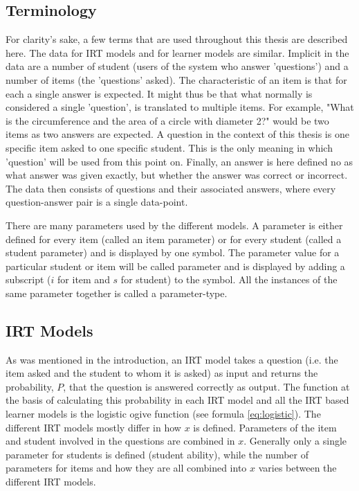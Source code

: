 \documentclass{scrartcl}
\begin{document}
\subsection{Terminology}
For clarity's sake, a few terms that are used throughout this thesis are described here. The data for IRT models and for learner models are similar. Implicit in the data are a number of student (users of the system who answer 'questions') and a number of items (the 'questions' asked). The characteristic of an item is that for each a single answer is expected. It might thus be that what normally is considered a single 'question', is translated to multiple items. For example, "What is the circumference and the area of a circle with diameter 2?" would be two items as two answers are expected. A question in the context of this thesis is one specific item asked to one specific student. This is the only meaning in which 'question' will be used from this point on. Finally, an answer is here defined no as what answer was given exactly, but whether the answer was correct or incorrect. The data then consists of questions and their associated answers, where every question-answer pair is a single data-point.  

There are many parameters used by the different models. A parameter is either defined for every item (called an item parameter) or for every student (called a student parameter) and is displayed by one symbol. The parameter value for a particular student or item will be called parameter and is displayed by adding a subscript ($i$ for item and $s$ for student) to the symbol. All the instances of the same parameter together is called a parameter-type. 

\subsection{IRT Models}
As was mentioned in the introduction, an IRT model takes a question (i.e. the item asked and the student to whom it is asked) as input and returns the probability, $P$, that the question is answered correctly as output. The function at the basis of calculating this probability in each IRT model and all the IRT based learner models is the logistic ogive function (see formula \ref{eq:logistic}). The different IRT models mostly differ in how $x$ is defined. Parameters of the item and student involved in the questions are combined in $x$. Generally only a single parameter for students is defined (student ability), while the number of parameters for items and how they are all combined into $x$ varies between the different IRT models.
 
\end{document}
